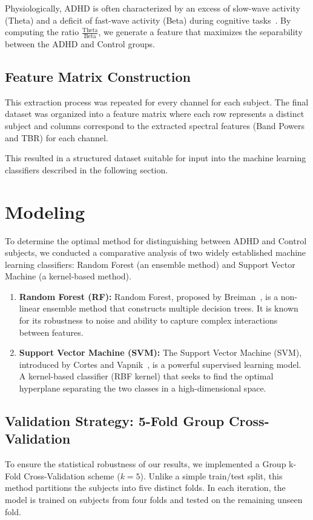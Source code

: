 \documentclass[11pt,a4paper]{article}
\begin{document}
Physiologically, ADHD is often characterized by an excess of slow-wave activity (Theta) and a deficit of fast-wave activity (Beta) during 
cognitive tasks~\cite{clarke2002eeg}. By computing the ratio $\frac{\text{Theta}}{\text{Beta}}$, we generate a feature that maximizes the 
separability between the ADHD and Control groups.


\subsection{Feature Matrix Construction}
This extraction process was repeated for every channel for each subject. The final dataset was organized into a feature matrix where each row 
represents a distinct subject and columns correspond to the extracted spectral features (Band Powers and TBR) for each channel. 

This resulted in a structured dataset suitable for input into the machine learning classifiers described in the following section.


\section{Modeling}\label{sec:modeling}
To determine the optimal method for distinguishing between ADHD and Control subjects, we conducted a comparative analysis of two widely 
established machine learning classifiers: Random Forest (an ensemble method) and Support Vector Machine (a kernel-based method).

\begin{enumerate}
    \item \textbf{Random Forest (RF):} Random Forest, proposed by Breiman~\cite{breiman2001random}, is a non-linear ensemble method that 
        constructs multiple decision trees. It is known for its robustness to noise and ability to capture complex interactions between 
        features.
    \item \textbf{Support Vector Machine (SVM):} The Support Vector Machine (SVM), introduced by Cortes and Vapnik~\cite{cortes1995support}, 
        is a powerful supervised learning model. A kernel-based classifier (RBF kernel) that seeks to find the optimal hyperplane separating 
        the two classes in a high-dimensional space.
\end{enumerate}

\subsection{Validation Strategy: 5-Fold Group Cross-Validation}
To ensure the statistical robustness of our results, we implemented a Group k-Fold Cross-Validation scheme ($k=5$). Unlike a simple 
train/test split, this method partitions the subjects into five distinct folds. In each iteration, the model is trained on subjects from four 
folds and tested on the remaining unseen fold.
\end{document}
